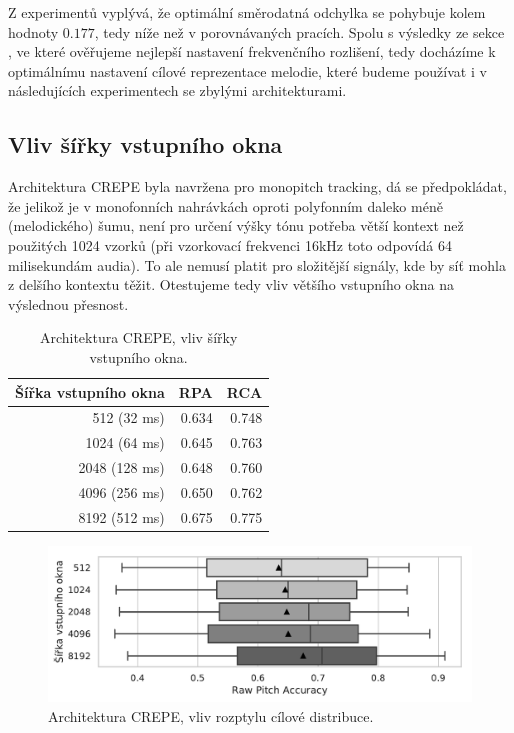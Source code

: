 Z experimentů vyplývá, že optimální směrodatná odchylka se pohybuje kolem hodnoty $0.177$, tedy níže než v porovnávaných pracích. Spolu s výsledky ze sekce , ve které ověřujeme nejlepší nastavení frekvenčního rozlišení, tedy docházíme k optimálnímu nastavení cílové reprezentace melodie, které budeme používat i v následujících experimentech se zbylými architekturami.


\subsection{Vliv šířky vstupního okna}

Architektura CREPE byla navržena pro monopitch tracking, dá se předpokládat, že jelikož je v monofonních nahrávkách oproti polyfonním daleko méně (melodického) šumu, není pro určení výšky tónu potřeba větší kontext než použitých 1024 vzorků (při vzorkovací frekvenci 16kHz toto odpovídá 64 milisekundám audia). To ale nemusí platit pro složitější signály, kde by síť mohla z delšího kontextu těžit. Otestujeme tedy vliv většího vstupního okna na výslednou přesnost.


\begin{table}[h!]
\centering
    \begin{tabular}{rrr}
    \toprule
    Šířka vstupního okna &   RPA &   RCA \\
    \midrule
    512 (32 ms)   & 0.634 & 0.748 \\
    1024 (64 ms)  & 0.645 & 0.763 \\
    2048 (128 ms) & 0.648 & 0.760 \\
    4096 (256 ms) & 0.650 & 0.762 \\
    8192 (512 ms) & 0.675 & 0.775 \\
    \bottomrule
    \end{tabular}

\caption{Architektura CREPE, vliv šířky vstupního okna.}\label{tab:crepe_sirka}
\end{table}

\begin{figure}[h]\centering
    \includegraphics[scale=0.6]{../img/figures/crepe_sirka_grey}
\caption{Architektura CREPE, vliv rozptylu cílové distribuce.}\label{obr:crepe_sirka}
\end{figure}

